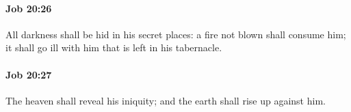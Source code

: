 		\paragraph{Job 20:26} %
			\label{JOB-20-26}

			All darkness shall be hid in his secret places: a fire not blown shall consume him; it shall go ill with him that is left in his tabernacle.


		\paragraph{Job 20:27} %
			\label{JOB-20-27}

			The heaven shall reveal his iniquity; and the earth shall rise up against him.


